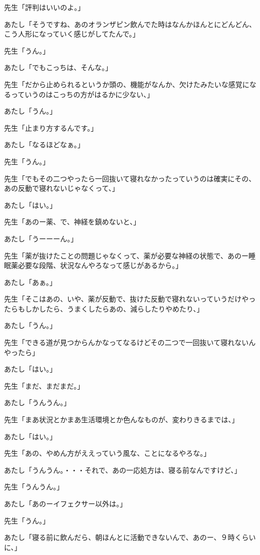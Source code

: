 \documentclass[b5j,twoside,twocolumn]{utarticle}
\begin{document}
\begin{description}
\item 先生「評判はいいのよ。」
\item あたし「そうですね、あのオランザピン飲んでた時はなんかほんとにどんどん、こう人形になっていく感じがしてたんで。」
\item 先生「うん。」
\item あたし「でもこっちは、そんな。」
\item 先生「だから止められるというか頭の、機能がなんか、欠けたみたいな感覚になるっていうのはこっちの方がはるかに少ない、」
\item あたし「うん。」
\item 先生「止まり方するんです。」
\item あたし「なるほどなぁ。」
\item 先生「うん。」
\item 先生「でもその二つやったら一回抜いて寝れなかったっていうのは確実にその、あの反動で寝れないじゃなくって、」
\item あたし「はい。」
\item 先生「あのー薬、で、神経を鎮めないと、」
\item あたし「うーーーん。」
\item 先生「薬が抜けたことの問題じゃなくって、薬が必要な神経の状態で、あのー睡眠薬必要な段階、状況なんやろなって感じがあるから。」
\item あたし「あぁ。」
\item 先生「そこはあの、いや、薬が反動で、抜けた反動で寝れないっていうだけやったらもしかしたら、うまくしたらあの、減らしたりやめたり、」
\item あたし「うん。」
\item 先生「できる道が見つからんかなってなるけどその二つで一回抜いて寝れないんやったら」
\item あたし「はい。」
\item 先生「まだ、まだまだ。」
\item あたし「うんうん。」
\item 先生「まあ状況とかまあ生活環境とか色んなものが、変わりきるまでは、」
\item あたし「はい。」
\item 先生「あの、やめん方がええっていう風な、ことになるやろな。」
\item あたし「うんうん。・・・それで、あの一応処方は、寝る前なんですけど、」
\item 先生「うんうん。」
\item あたし「あのーイフェクサー以外は。」
\item 先生「うん。」
\item あたし「寝る前に飲んだら、朝ほんとに活動できないんで、あのー、９時くらいに、」

\end{description}
\end{document}
